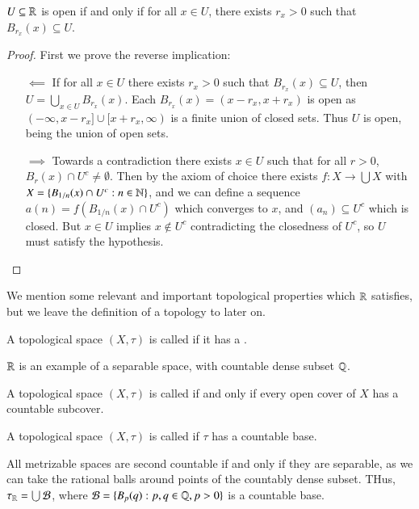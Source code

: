 \begin{proposition}
    $U \subseteq \mathbb R$ is open if and only if for all $x \in U$, there exists $r_x > 0$ such that $B_{r_x}(x) \subseteq U$.
\end{proposition}
\begin{proof}
    First we prove the reverse implication: \begin{itemize}
        \item[$\impliedby$] If for all $x \in U$ there exists $r_x > 0$ such that $B_{r_x}(x) \subseteq U$, then $U = \bigcup_{x \in U}B_{r_x}(x)$. Each $B_{r_x}(x) = (x-r_x,x+r_x)$ is open as $(-\infty,x-r_x]\cup[x+r_x,\infty)$ is a finite union of closed sets. Thus $U$ is open, being the union of open sets.
        \item[$\implies$] Towards a contradiction there exists $x \in U$ such that for all $r > 0$, $B_r(x) \cap U^c \neq \emptyset$. Then by the axiom of choice there exists $f:X\rightarrow \bigcup X$ with $X = \{B_{1/n}(x)\cap U^c:n \in \mathbb N\}$, and we can define a sequence $a(n) = f(B_{1/n}(x)\cap U^c)$ which converges to $x$, and $(a_n) \subseteq U^c$ which is closed. But $x \in U$ implies $x \notin U^c$ contradicting the closedness of $U^c$, so $U$ must satisfy the hypothesis.
    \end{itemize}
\end{proof}

We mention some relevant and important topological properties which $\mathbb R$ satisfies, but we leave the definition of a topology to later on.

\begin{definition}
    A topological space $(X,\tau)$ is called  if it has a .
\end{definition}

$\mathbb R$ is an example of a separable space, with countable dense subset $\mathbb Q$.

\begin{definition}
    A topological space $(X,\tau)$ is called  if and only if every open cover of $X$ has a countable subcover.
\end{definition}

\begin{definition}
    A topological space $(X,\tau)$ is called  if $\tau$ has a countable base.
\end{definition}

All metrizable spaces are second countable if and only if they are separable, as we can take the rational balls around points of the countably dense subset. THus, $\tau_{\mathbb R} = \bigcup \mathcal{B}$, where $\mathcal{B} = \{B_p(q):p,q \in \mathbb Q, p > 0\}$ is a countable base.

